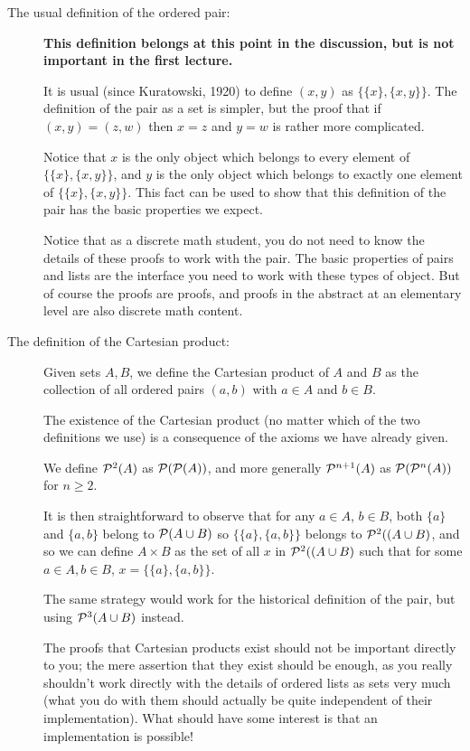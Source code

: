 \documentclass[12pt]{article}
\begin{document}
\begin{description}
\item[The usual definition of the ordered pair:]

{\bf This definition belongs at this point in the discussion, but is not important in the first lecture.}

It is usual (since Kuratowski, 1920) to define $(x,y)$ as $\{\{x\},\{x,y\}\}$.  The definition of the pair as a set is simpler,
but the proof that if $(x,y)=(z,w)$ then $x=z$ and $y=w$ is rather more complicated.

Notice that $x$ is the only object which belongs to every element of $\{\{x\},\{x,y\}\}$, and $y$ is the only object which belongs to exactly one element of $\{\{x\},\{x,y\}\}$.  This fact can be used to show that this definition of the pair has the basic properties we expect.

Notice that as a discrete math student, you do not need to know the details of these proofs to work with the pair.  The basic properties of pairs and lists are the interface you need to work with these types of object.  But of course the proofs are proofs, and proofs in the abstract at an elementary level are also discrete math content.

\item[The definition of the Cartesian product:]

Given sets $A,B$, we define the Cartesian product of $A$ and $B$ as the collection of all ordered pairs
$(a,b)$ with $a \in A$ and $b \in B$.

The existence of the Cartesian product (no matter which of the two definitions we use) is a consequence of the axioms we have already given.

We define ${\cal P}^2(A)$ as ${\cal P}({\cal P}(A))$, and more generally ${\cal P}^{n+1}(A)$ as 
${\cal P}({\cal P}^n(A))$ for $n \geq 2$.

It is then straightforward to observe that for any $a \in A$, $b \in B$, both $\{a\}$ and $\{a,b\}$ belong to ${\cal P}(A \cup B)$ so $\{\{a\},\{a,b\}\}$ belongs to ${\cal P}^2((A \cup B)$, and so we can define $A \times B$ as the set of all $x$ in ${\cal P}^2((A \cup B)$ such that for some $a\in A, b\in B$, $x = \{\{a\},\{a,b\}\}$.

The same strategy would work for the historical definition of the pair, but using ${\cal P}^3(A \cup B)$ instead.

The proofs that Cartesian products exist should not be important directly to you;  the mere assertion that they exist should be enough, as you really shouldn't work directly with the details of ordered lists as sets very much (what you do with them should actually be quite independent of their implementation).  What should have some interest is that an implementation is possible!

\end{description}
\end{document}
